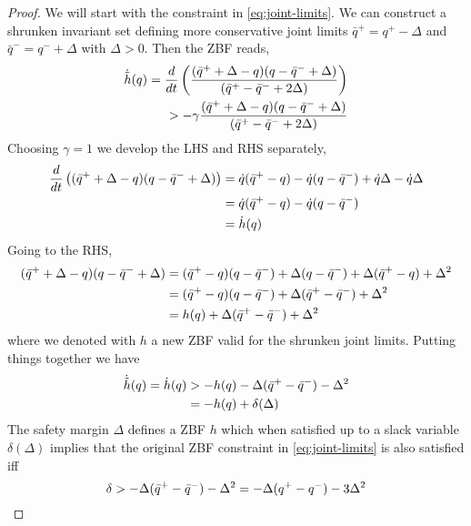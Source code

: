 \begin{proof}
We will start with the constraint in \eqref{eq:joint-limits}. We can construct a shrunken invariant set defining more conservative joint limits $\bar{q}^+ = q^+ - \Delta$ and $\bar{q}^- = q^- + \Delta$ with $\Delta > 0$. Then the ZBF reads,
\begin{align}
    \dot{\tilde{h}}(q) = \frac{d}{dt} \left(\frac{(\bar{q}^+ + \Delta - q)(q - \bar{q}^- + \Delta)}{(\bar{q}^+ - \bar{q}^- + 2\Delta)}\right) \\
    > -\gamma \frac{(\bar{q}^+ + \Delta - q)(q - \bar{q}^- + \Delta)}{(\bar{q}^+ - \bar{q}^- + 2\Delta)}
\end{align}
Choosing $\gamma=1$ we develop the LHS and RHS separately,
\begin{align}
    \frac{d}{dt} \left((\bar{q}^+ + \Delta - q)(q - \bar{q}^- + \Delta)\right) 
    &= \dot{q}(\bar{q}^+ - q)  -\dot{q}(q - \bar{q}^-) + \dot{q}\Delta - \dot{q}\Delta \\
    &= \dot{q}(\bar{q}^+ - q)  -\dot{q}(q - \bar{q}^-)\\
    &= \dot{h}(q)
\end{align}
Going to the RHS, 
\begin{align}
   (\bar{q}^+ + \Delta - q)(q - \bar{q}^- + \Delta) 
   &= (\bar{q}^+ - q)(q - \bar{q}^-) + \Delta(q - \bar{q}^-) + \Delta(\bar{q}^+ - q) + \Delta^2 \\
   &= (\bar{q}^+ - q)(q - \bar{q}^-)+ \Delta(\bar{q}^+ - \bar{q}^- ) + \Delta^2 \\
   &= h(q) + \Delta(\bar{q}^+ - \bar{q}^- ) + \Delta^2
\end{align}
where we denoted with $h$ a new ZBF valid for the shrunken joint limits. Putting things together we have
\begin{align}
    \dot{\tilde{h}}(q) = \dot{h}(q)
    &> -h(q) - \Delta(\bar{q}^+ - \bar{q}^- ) - \Delta^2 \\
    &= -h(q) + \delta(\Delta)
\end{align}
The safety margin $\Delta$ defines a ZBF $h$ which when satisfied up to a slack variable $\delta({\Delta})$ implies that the original ZBF constraint in \eqref{eq:joint-limits} is also satisfied iff
\begin{equation*}
    \delta > -\Delta(\bar{q}^+ - \bar{q}^- ) - \Delta^2 = -\Delta (q^+ - q^-) - 3\Delta^2
\end{equation*}


\end{proof}
